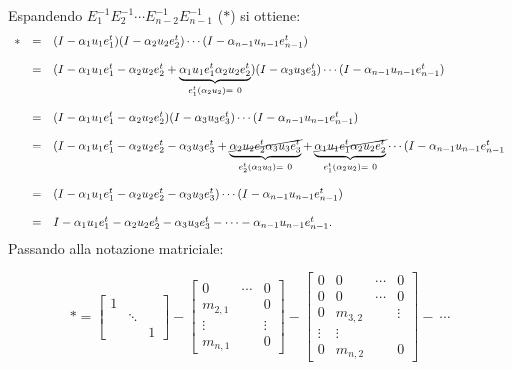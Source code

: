 Espandendo $E_{1}^{-1}E_{2}^{-1} \cdots E_{n-2}^{-1}E_{n-1}^{-1}$ ($*$) si ottiene:
\[
\begin{array}{ccl}
* & = &
(I-\alpha_1u_1e_1^t)(I-\alpha_2u_2e_2^t)\cdots(I -\alpha_{n-1}u_{n-1}e_{n-1}^t)\\
\\& = & (I -\alpha_1u_1e_1^t-\alpha_2u_2e_2^t+
\underbrace{\alpha_1u_1e_1^t\alpha_2u_2e_2^t }_{e_1^t(\alpha_2u_2) =\ 0})
(I -\alpha_3u_3e_3^t)\cdots(I -\alpha_{n-1}u_{n-1}e_{n-1}^t)\\
\\& = & (I -\alpha_1u_1e_1^t-\alpha_2u_2e_2^t)
(I -\alpha_3u_3e_3^t)\cdots(I -\alpha_{n-1}u_{n-1}e_{n-1}^t)\\
\\& = & (I -\alpha_1u_1e_1^t-\alpha_2u_2e_2^t-\alpha_3u_3e_3^t
+\underbrace{\cancel{\alpha_2u_2e_2^t\alpha_3u_3e_3^t}}_{e_2^t(\alpha_3u_3) =\ 0}
+\underbrace{\cancel{\alpha_1u_1e_1^t\alpha_2u_2e_2^t}}_{e_1^t(\alpha_2u_2) =\ 0}
\cdots(I -\alpha_{n-1}u_{n-1}e_{n-1}^t\\
\\& = & (I -\alpha_1u_1e_1^t-\alpha_2u_2e_2^t-\alpha_3u_3e_3^t)
\cdots (I -\alpha_{n-1}u_{n-1}e_{n-1}^t) \\
\\& = & I -\alpha_1u_1e_1^t-\alpha_2u_2e_2^t-\alpha_3u_3e_3^t -
\cdots -\alpha_{n-1}u_{n-1}e_{n-1}^t.
\end{array}
\]
Passando alla notazione matriciale:

\[
* =
\left[\begin{array}{ccc}
1 & & \\
& \ddots & \\
& & 1
\end{array}\right]-
\left[\begin{array}{ccc}
0 & \cdots & 0 \\
m_{2,1} & & 0 \\
\vdots & & \vdots \\
m_{n,1} & & 0
\end{array}\right]-
\left[\begin{array}{cccc}
0 & 0 & \cdots & 0 \\
0 & 0 & \cdots & 0 \\
0 & m_{3,2} & &\vdots \\
\vdots & \vdots & &\\
0 & m_{n,2} & & 0
\end{array}\right] -\ \cdots
\]

